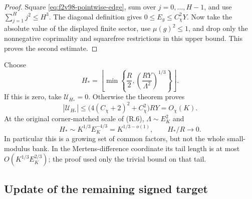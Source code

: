 \documentclass[11pt]{article}
\theoremstyle{definition}
\theoremstyle{remark}
\begin{document}
\begin{proof}
Square \eqref{eq:f2v98-pointwise-edge}, sum over \(j=0,\ldots,H-1\),
and use \(\sum_{j=1}^Hj^2\le H^3\).
The diagonal definition gives \(0\le E_g\le C_\chi^2Y\).
Now take the absolute value of the displayed finite sector, use
\(\mu(g)^2\le1\), and drop only the nonnegative coprimality and
squarefree restrictions in this upper bound.  This proves the second
estimate.
\end{proof}

Choose
\begin{equation}
 H_* =\left\lfloor\min\left\{\frac R2,
                       \left(\frac{RY}{\Lambda^2}\right)^{1/3}
                          \right\}\right\rfloor.
 \label{eq:f2v98-Hstar}
\end{equation}
If this is zero, take \(\mathcal U_{H_*}=0\).  Otherwise the theorem
proves
\begin{equation}
 |\mathcal U_{H_*}|\le
          \bigl(4(C_\chi+2)^2+C_\chi^2\bigr)RY=O_\chi(K).
 \label{eq:f2v98-closed-sector}
\end{equation}
At the original corner-matched scale of (R.6),
\(\Lambda\sim E_K^2\) and
\begin{equation}
 H_*\sim K^{1/3}E_K^{-4/3}=K^{1/3-o(1)},\qquad
                  H_*/R\longrightarrow0.
 \label{eq:f2v98-edge-scale}
\end{equation}
In particular this is a growing set of common factors, but not the
whole small-modulus bank.  In the Mertens-difference coordinate its
tail length is at most \(O(K^{1/3}E_K^{2/3})\); the proof used
only the trivial bound on that tail.

\subsection{Update of the remaining signed target}
\end{document}
